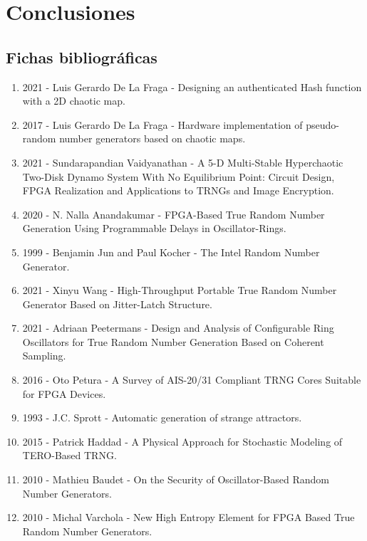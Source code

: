 \chapter{Conclusiones}
	
	
	
	
	
	
	\section{Fichas bibliográficas}


		\begin{enumerate}
				\item 2021 - Luis Gerardo De La Fraga - Designing an authenticated Hash function with a 2D chaotic map. \cite{Fraga2021}
				\item 2017 - Luis Gerardo De La Fraga - Hardware implementation of pseudo-random number generators based on chaotic maps. \cite{Fraga2017}
				\item 2021 - Sundarapandian Vaidyanathan - A 5-D Multi-Stable Hyperchaotic Two-Disk Dynamo System With No Equilibrium Point: Circuit Design, FPGA Realization and Applications to TRNGs and Image Encryption. \cite{Vaidyanathan2021}
				\item 2020 - N. Nalla Anandakumar - FPGA-Based True Random Number Generation Using Programmable Delays in Oscillator-Rings. \cite{Anandakumar2020}
				\item 1999 - Benjamin Jun and Paul Kocher - The Intel Random Number Generator. \cite{Jun1999}
				\item 2021 - Xinyu Wang - High-Throughput Portable True Random Number Generator Based on Jitter-Latch Structure. \cite{Wang2021}
				\item 2021 - Adriaan Peetermans - Design and Analysis of Configurable Ring Oscillators for True Random Number Generation Based on Coherent Sampling. \cite{Peetermans2021}
				\item 2016 - Oto Petura - A Survey of AIS-20/31 Compliant TRNG Cores Suitable for FPGA Devices. \cite{Petura2016}
				\item 1993 - J.C. Sprott - Automatic generation of strange attractors. \cite{Sprott1993}
				\item 2015 - Patrick Haddad - A Physical Approach for Stochastic Modeling of TERO-Based TRNG. \cite{Haddad2015}
				\item 2010 - Mathieu Baudet - On the Security of Oscillator-Based Random Number Generators.  \cite{Baudet2010}
				\item 2010 - Michal Varchola - New High Entropy Element for FPGA Based True Random Number Generators. \cite{Varchola2010}

\end{enumerate}
